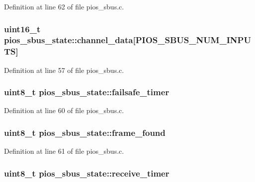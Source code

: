 \-Definition at line 62 of file pios\-\_\-sbus.\-c.

\hypertarget{structpios__sbus__state_ac6e4db09887aa141183e800d990ad794}{
\subsubsection[{channel\-\_\-data}]{\setlength{\rightskip}{0pt plus 5cm}uint16\-\_\-t {\bf pios\-\_\-sbus\-\_\-state\-::channel\-\_\-data}\mbox{[}\-P\-I\-O\-S\-\_\-\-S\-B\-U\-S\-\_\-\-N\-U\-M\-\_\-\-I\-N\-P\-U\-T\-S\mbox{]}}}\label{structpios__sbus__state_ac6e4db09887aa141183e800d990ad794}


\-Definition at line 57 of file pios\-\_\-sbus.\-c.

\hypertarget{structpios__sbus__state_a5238707dcd8e68afb924becd99a5ea83}{
\subsubsection[{failsafe\-\_\-timer}]{\setlength{\rightskip}{0pt plus 5cm}uint8\-\_\-t {\bf pios\-\_\-sbus\-\_\-state\-::failsafe\-\_\-timer}}}\label{structpios__sbus__state_a5238707dcd8e68afb924becd99a5ea83}


\-Definition at line 60 of file pios\-\_\-sbus.\-c.

\hypertarget{structpios__sbus__state_a44f2ee1a5d510745a695cd8a38324559}{
\subsubsection[{frame\-\_\-found}]{\setlength{\rightskip}{0pt plus 5cm}uint8\-\_\-t {\bf pios\-\_\-sbus\-\_\-state\-::frame\-\_\-found}}}\label{structpios__sbus__state_a44f2ee1a5d510745a695cd8a38324559}


\-Definition at line 61 of file pios\-\_\-sbus.\-c.

\hypertarget{structpios__sbus__state_a064c8174115b5d3e710a97e8a0df781f}{
\subsubsection[{receive\-\_\-timer}]{\setlength{\rightskip}{0pt plus 5cm}uint8\-\_\-t {\bf pios\-\_\-sbus\-\_\-state\-::receive\-\_\-timer}}}\label{structpios__sbus__state_a064c8174115b5d3e710a97e8a0df781f}



